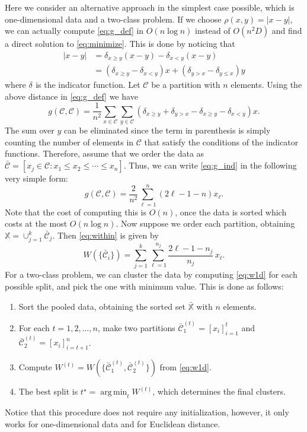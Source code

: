 \documentclass{article}
\DeclareMathOperator*{\argmin}{arg\,min}
\newcommand\C{{\mathcal{C}}}
\newcommand{\Ind}[1]{\delta_{#1}}
\begin{document}
Here we consider an alternative approach in the simplest case possible, which
is one-dimensional data and a two-class problem.
If we choose
$\rho(x,y) = |x - y|$, we can actually compute 
\eqref{eq:g_def} in $O(n \log n)$ instead of $O(n^2 D)$ and find
a direct solution to \eqref{eq:minimize}. 
This is done by noticing that
\begin{equation}
\begin{aligned}
|x - y|  &= \Ind{x \ge y} (x - y) -
\Ind{x < y} (x - y) \\
&= 
\left( \Ind{x \ge y} - \Ind{x < y} \right) x + 
\left( \Ind{y > x} - \Ind{y \le x} \right) y
\end{aligned}
\end{equation}
where $\Ind{}$ is the indicator function.
Let $\C$ be a partition with
$n$ elements. Using the above distance in \eqref{eq:g_def} we have
\begin{equation}
\label{eq:g_ind}
g(\C,\C) = \dfrac{1}{n^2} \sum_{x \in \C} 
\sum_{y \in \C} 
\left(
\Ind{x \ge y} + \Ind{y > x} - 
\Ind{x \ge y}-\Ind{x < y} \right) x.
\end{equation}
The sum over $y$ can be eliminated since the term in
parenthesis is simply counting the number of elements in $\C$ that satisfy
the conditions of the indicator functions. Therefore, assume
that we order the data as 
$\bar{\C} = [ x_j \in \C: x_1 \le x_2 \le \dotsm \le x_{n}]$. Thus, we
can write \eqref{eq:g_ind} in the following very simple form:
\begin{equation}
\label{eq:g1d}
g(\C, \C) = \dfrac{2}{n^2} \sum_{\ell=1}^n (2\ell - 1 - n) x_\ell .
\end{equation}
Note that the cost of computing this is $O(n)$, once the data
is sorted which costs at the most $O(n\log n)$.
Now suppose we order each partition, obtaining $\mathbb{X} = \cup_{j=1}^k
\bar{\C}_j$. Then \eqref{eq:within} is given by
\begin{equation}
\label{eq:w1d}
W(\{ \bar{\C}_i \}) = 
\sum_{j=1}^k \sum_{\ell=1}^{n_j} \dfrac{2\ell - 1 - n_j}{n_j} \, x_\ell.
\end{equation}
For a two-class problem, we can cluster the data by computing \eqref{eq:w1d}
for each possible split, and pick the one with minimum value. This is done
as follows:
\begin{enumerate}
\item Sort the pooled data, obtaining the sorted set $\bar{\mathbb{X}}$ with
$n$ elements.
\item For each $t=1,2,\dotsc,n$, make two partitions 
$\bar{\C}_1^{(t)} = [x_i]_{i=1}^t$ and 
$\bar{\C}_2^{(t)} = [x_i]_{i=t+1}^n$. 
\item Compute $W^{(t)} = W(\{ \bar{\C}_1^{(t)},\bar{\C}_2^{(t)}  \})$ 
from \eqref{eq:w1d}.
\item The best split is $t^\star = \argmin_t W^{(t)}$, which
determines the final clusters.
\end{enumerate}
Notice that this procedure does not require any initialization, however,
it only works for one-dimensional data and for Euclidean distance.
\end{document}

